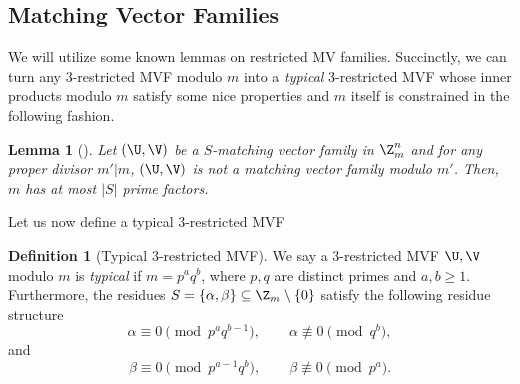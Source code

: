 \documentclass[11pt]{article}
\newtheorem{lemma}[maintheorem]{Lemma}
\theoremstyle{definition}
\newtheorem{definition}[maintheorem]{Definition}
\newtheorem{fact}[maintheorem]{Fact}
\begin{document}




\subsection{Matching Vector Families}

We will utilize some known lemmas on restricted MV families. Succinctly, we can turn any $3$-restricted MVF modulo $m$ into a \emph{typical} $3$-restricted MVF whose inner products modulo $m$ satisfy some nice properties and $m$ itself is constrained in the following fashion. 

\begin{lemma}[\cite{bdl13, aggarwal2025}] \label{lem:residues_bdl}
Let $(\U, \V)$ be a $S$-matching vector family in $\Z_m^n$ and for any proper divisor $m' | m$, $(\U, \V)$ is not a matching vector family modulo $m'$. Then, $m$ has at most $|S|$ prime factors.
\end{lemma}

Let us now define a typical $3$-restricted MVF 

\begin{definition}[Typical $3$-restricted MVF]\label{def:typical-mvf}
We say a $3$-restricted MVF $\U, \V$ modulo $m$ is \emph{typical} if  $m=p^aq^b$, where $p,q$ are distinct primes and $a, b \geq 1$. Furthermore, the residues 
$S = \{\alpha,\beta\} \subseteq \Z_m\setminus\{0\}$ satisfy the following residue structure
\[
\alpha \equiv 0 \pmod{p^aq^{b-1}},
\qquad
\alpha \not\equiv 0 \pmod{q^b},
\]
and
\[
\beta \equiv 0 \pmod{p^{a-1}q^b},
\qquad
\beta \not\equiv 0 \pmod{p^a}.
\]
\end{definition}
\end{document}
